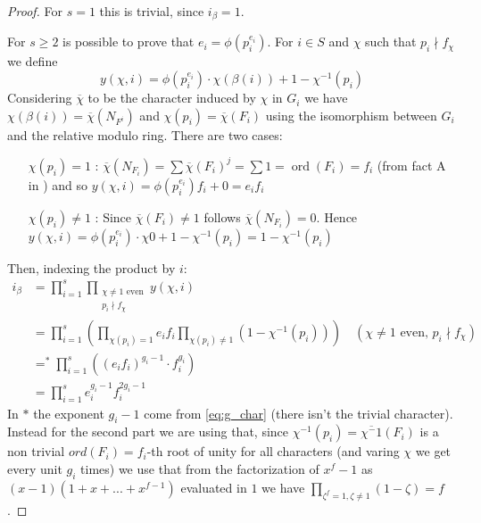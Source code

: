 \documentclass[]{article}
\theoremstyle{plain}
\theoremstyle{remark}
\theoremstyle{definition}
\DeclareMathOperator*{\eqb }{=}
\DeclareMathOperator{\ord}{ord}
\begin{document}
	\begin{proof}
		For $ s=1 $ this is trivial, since $ i_\beta = 1 $. 
		
		For $ s \geq 2 $ is possible to prove that $ e_i = \phi ( p_i ^ {e_i}) $. For $ i \in S$ and $ \chi $ such that $ p_i \nmid f_\chi $ we define
		 \[ y(\chi , i) = \phi(p_i^{e_i}) \cdot \chi (\beta (i))  + 1- \chi^{-1} (p_i) \]
		Considering $ \overline{\chi} $ to be the character induced by $ \chi $ in $ G_i$ we have $ \chi(\beta(i)) = \overline{\chi}(N_{F^i})  $ and $ \chi (p_i) = \overline{\chi}(F_i) $ using the isomorphism between $ G_i $ and the relative modulo ring. There are two cases: 
		\begin{itemize}
		\item[$ \chi(p_i) = 1 $ :] $ \overline{\chi}(N_{F_i}) = \sum \overline{\chi}(F_i)^j = \sum 1 = \ord (F_i) = f_i$ (from fact A in \cite[Page~544]{RIN}) and so $ y(\chi , i) = \phi(p_i^{e_i})f_i + 0 = e_i f_i $
		\item[$ \chi(p_i) \neq 1 $ :] Since $ \overline{\chi}({F_i})  \neq 1 $ follows $ \overline{\chi}(N_{F_i}) = 0 $. %
		Hence $ y(\chi , i) = \phi(p_i^{e_i}) \cdot \chi 0  + 1- \chi^{-1} (p_i)= 1- \chi^{-1} (p_i) $
		\end{itemize}
		Then, indexing the product by $ i $:
		\begin{align*}
			i_\beta & = \prod_{i=1}^s	\prod_{ \substack{\chi \neq 1 \text{ even}\\ p_i \nmid f_\chi }} y(\chi ,i)				\\	
			& = \prod_{i=1}^s		\left( \prod_{ \chi(p_i) = 1  } e_i f_i \prod_{\chi(p_i) \neq 1}  (1- \chi^{-1} (p_i))\right) 	\quad (\chi \neq 1 \text{ even, } p_i\nmid f_\chi )		\\	
			& \eqb ^\ast  \prod_{i=1}^s	((e_i f_i )^{g_i - 1} \cdot f_i ^{g_i})				\\	
			 & = \prod_{i=1}^s		e_i^{g_i - 1} f_i ^{2 g_i - 1}		
		\end{align*}
		In $\ast$ the exponent $ g_i - 1 $ come from \ref{eq:g_char} (there isn't the trivial character). Instead for the second part we are using that, since $ \chi^{-1}(p_i) = \overline{\chi^-1}({F_i})  $ is a non trivial $ ord(F_i)=f_i $-th root of unity for all characters (and varing $ \chi $ we get every unit $ g_i $ times) we use that from the factorization of $ x^f - 1  $ as $ (x - 1 )(1 + x + ... + x^{f-1}) $ evaluated in $ 1 $ we have $ \prod_{\zeta^f=1, \zeta\neq 1} (1- \zeta) = f $.
		
		
	\end{proof}
	
	
	\newpage
	\printbibliography
\end{document}
